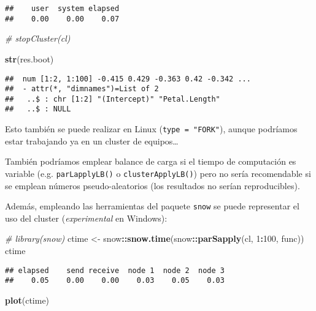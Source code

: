 \documentclass[]{book}
\newenvironment{Shaded}{\begin{snugshade}}{\end{snugshade}}
\newcommand{\KeywordTok}[1]{\textcolor[rgb]{0.13,0.29,0.53}{\textbf{#1}}}
\newcommand{\DecValTok}[1]{\textcolor[rgb]{0.00,0.00,0.81}{#1}}
\newcommand{\StringTok}[1]{\textcolor[rgb]{0.31,0.60,0.02}{#1}}
\newcommand{\CommentTok}[1]{\textcolor[rgb]{0.56,0.35,0.01}{\textit{#1}}}
\newcommand{\OperatorTok}[1]{\textcolor[rgb]{0.81,0.36,0.00}{\textbf{#1}}}
\newcommand{\NormalTok}[1]{#1}
\theoremstyle{break}
\theoremstyle{definition}
\theoremstyle{definition}
\theoremstyle{definition}
\theoremstyle{remark}
\begin{document}
\begin{verbatim}
##    user  system elapsed 
##    0.00    0.00    0.07
\end{verbatim}

\begin{Shaded}
\begin{Highlighting}[]
\CommentTok{# stopCluster(cl)}

\KeywordTok{str}\NormalTok{(res.boot)}
\end{Highlighting}
\end{Shaded}

\begin{verbatim}
##  num [1:2, 1:100] -0.415 0.429 -0.363 0.42 -0.342 ...
##  - attr(*, "dimnames")=List of 2
##   ..$ : chr [1:2] "(Intercept)" "Petal.Length"
##   ..$ : NULL
\end{verbatim}

Esto también se puede realizar en Linux (\texttt{type\ =\ "FORK"}),
aunque podríamos estar trabajando ya en un cluster de equipos\ldots{}

También podríamos emplear balance de carga si el tiempo de computación
es variable (e.g. \texttt{parLapplyLB()} o \texttt{clusterApplyLB()})
pero no sería recomendable si se emplean números pseudo-aleatorios (los
resultados no serían reproducibles).

Además, empleando las herramientas del paquete \texttt{snow} se puede
representar el uso del cluster (\emph{experimental} en Windows):

\begin{Shaded}
\begin{Highlighting}[]
\CommentTok{# library(snow)}
\NormalTok{ctime <-}\StringTok{ }\NormalTok{snow}\OperatorTok{::}\KeywordTok{snow.time}\NormalTok{(snow}\OperatorTok{::}\KeywordTok{parSapply}\NormalTok{(cl, }\DecValTok{1}\OperatorTok{:}\DecValTok{100}\NormalTok{, func))}
\NormalTok{ctime}
\end{Highlighting}
\end{Shaded}

\begin{verbatim}
## elapsed    send receive  node 1  node 2  node 3 
##    0.05    0.00    0.00    0.03    0.05    0.03
\end{verbatim}

\begin{Shaded}
\begin{Highlighting}[]
\KeywordTok{plot}\NormalTok{(ctime)}
\end{Highlighting}
\end{Shaded}
\end{document}
